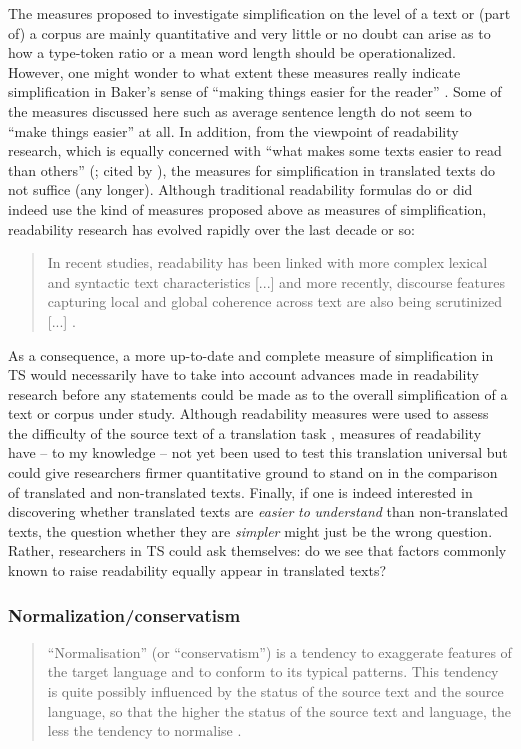 The measures proposed to investigate simplification on the level of a text or (part of) a corpus are mainly quantitative and very little or no doubt can arise as to how a type-token ratio or a mean word length should be operationalized. However, one might wonder to what extent these measures really indicate simplification in Baker’s sense of “making things easier for the reader” \citep[182]{baker_corpus-based_1996}. Some of the measures discussed here such as average sentence length do not seem to “make things easier” \citep{baker_corpus-based_1996} at all. In addition, from the viewpoint of readability research, which is equally concerned with “what makes some texts easier to read than others” (\citealt{dubay_principles_2004}; cited by \citealt{clercq_using_2014}), the measures for simplification in translated texts do not suffice (any longer). Although traditional readability formulas do or did indeed use the kind of measures proposed above as measures of simplification, readability research has evolved rapidly over the last decade or so:

\begin{quote}
In recent studies, readability has been linked with more complex lexical and syntactic text characteristics [...] and more recently, discourse features capturing local and global coherence across text are also being scrutinized [...] \citep[294]{clercq_using_2014}.
\end{quote}

As a consequence, a more up-to-date and complete measure of simplification in TS would necessarily have to take into account advances made in readability research before any statements could be made as to the overall simplification of a text or corpus under study. Although readability measures were used to assess the difficulty of the source text of a translation task \citep{gopferich_indicators_2009,sun_measuring_2014}, measures of readability have – to my knowledge – not yet been used to test this translation universal but could give researchers firmer quantitative ground to stand on in the comparison of translated and non-translated texts. Finally, if one is indeed interested in discovering whether translated texts are \textit{easier} \textit{to} \textit{understand} than non-translated texts, the question whether they are \textit{simpler} might just be the wrong question. Rather, researchers in TS could ask themselves: do we see that factors commonly known to raise readability equally appear in translated texts?

\subsubsection{Normalization/conservatism}
\label{sec:2.2.2.3}  
\begin{quote}
“Normalisation” (or “conservatism”) is a tendency to exaggerate features of the target language and to conform to its typical patterns. This tendency is quite possibly influenced by the status of the source text and the source language, so that the higher the status of the source text and language, the less the tendency to normalise \citep[183]{baker_corpus-based_1996}.
\end{quote}

